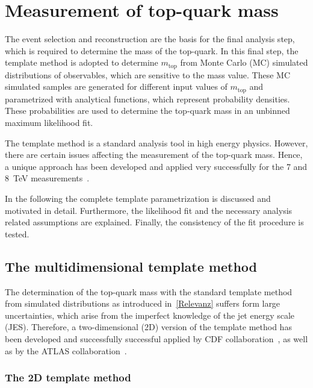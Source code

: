 \chapter{Measurement of top-quark mass}
\label{sec:Temp1}

The event selection and \rm reconstruction are the basis for the final analysis step, which is required to determine the mass of the top-quark. In this final step, the template method  is adopted to determine $m_{\text{top}}$  from Monte Carlo (MC) simulated distributions of observables, which are sensitive to the mass value. These MC simulated samples are generated for different input values of $m_{\text{top}}$ and parametrized with analytical functions, which represent probability densities. These probabilities are used to determine the top-quark mass in an unbinned maximum likelihood fit.

 The template method is a standard analysis tool in high energy physics. However, there are certain issues affecting the measurement of the top-quark mass.  Hence, a unique approach has been developed and applied very successfully for the 7 and 8~TeV measurements~\cite{Aad:2015nba,ATLAS-CONF-2017-071}.

In the following the complete template parametrization is discussed and motivated in detail. Furthermore, the likelihood fit and the necessary analysis related assumptions are explained. Finally, the consistency of the fit procedure is tested. 


\section{The multidimensional template method}



The determination of the top-quark mass with the standard template method from simulated distributions as introduced in~\cref{Relevanz}  suffers form large uncertainties, which arise from the imperfect knowledge of the jet energy scale (JES). 
Therefore, a two-dimensional (2D) version of the template method has been developed and successfully  successful applied  by CDF collaboration~\cite{Aaltonen:2011dr}, as well as by the ATLAS collaboration~\cite{ATLAS:2012aj}.

\subsection{ The 2D template method}

